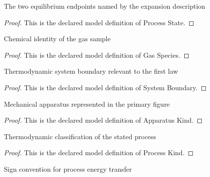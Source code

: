 \begin{definition}
  \label{def:physics:phyx-mini-0459:phyxminiproblems-problemphyxmini0459-processstate}
  The two equilibrium endpoints named by the expansion description
\end{definition}
\begin{proof}
  This is the declared model definition of Process State.
\end{proof}
\begin{definition}
  \label{def:physics:phyx-mini-0459:phyxminiproblems-problemphyxmini0459-gasspecies}
  Chemical identity of the gas sample
\end{definition}
\begin{proof}
  This is the declared model definition of Gas Species.
\end{proof}
\begin{definition}
  \label{def:physics:phyx-mini-0459:phyxminiproblems-problemphyxmini0459-systemboundary}
  Thermodynamic system boundary relevant to the first law
\end{definition}
\begin{proof}
  This is the declared model definition of System Boundary.
\end{proof}
\begin{definition}
  \label{def:physics:phyx-mini-0459:phyxminiproblems-problemphyxmini0459-apparatuskind}
  Mechanical apparatus represented in the primary figure
\end{definition}
\begin{proof}
  This is the declared model definition of Apparatus Kind.
\end{proof}
\begin{definition}
  \label{def:physics:phyx-mini-0459:phyxminiproblems-problemphyxmini0459-processkind}
  Thermodynamic classification of the stated process
\end{definition}
\begin{proof}
  This is the declared model definition of Process Kind.
\end{proof}
\begin{definition}
  \label{def:physics:phyx-mini-0459:phyxminiproblems-problemphyxmini0459-heatsignconvention}
  Sign convention for process energy transfer
\end{definition}
